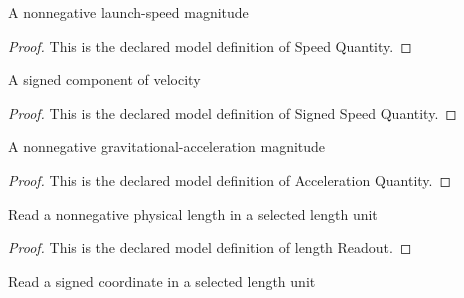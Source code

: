 \begin{definition}
  \label{def:physics:phyx-mini-0739:phyxminiproblems-problemphyxmini0739-speedquantity}
  A nonnegative launch-speed magnitude
\end{definition}
\begin{proof}
  This is the declared model definition of Speed Quantity.
\end{proof}
\begin{definition}
  \label{def:physics:phyx-mini-0739:phyxminiproblems-problemphyxmini0739-signedspeedquantity}
  A signed component of velocity
\end{definition}
\begin{proof}
  This is the declared model definition of Signed Speed Quantity.
\end{proof}
\begin{definition}
  \label{def:physics:phyx-mini-0739:phyxminiproblems-problemphyxmini0739-accelerationquantity}
  A nonnegative gravitational-acceleration magnitude
\end{definition}
\begin{proof}
  This is the declared model definition of Acceleration Quantity.
\end{proof}
\begin{definition}
  \label{def:physics:phyx-mini-0739:phyxminiproblems-problemphyxmini0739-lengthreadout}
  Read a nonnegative physical length in a selected length unit
\end{definition}
\begin{proof}
  This is the declared model definition of length Readout.
\end{proof}
\begin{definition}
  \label{def:physics:phyx-mini-0739:phyxminiproblems-problemphyxmini0739-signedlengthreadout}
  Read a signed coordinate in a selected length unit
\end{definition}
